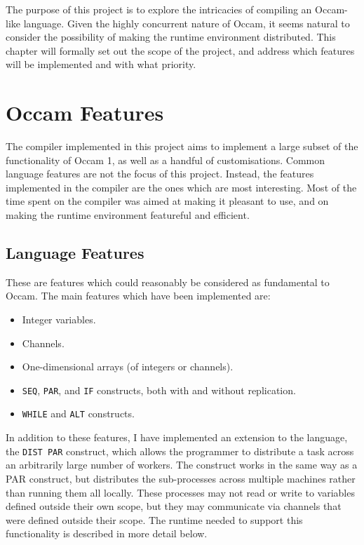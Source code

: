 The purpose of this project is to explore the intricacies of compiling an
Occam-like language. Given the highly concurrent nature of Occam, it seems
natural to consider the possibility of making the runtime environment
distributed. This chapter will formally set out the scope of the project, and
address which features will be implemented and with what priority.

\section{Occam Features}

The compiler implemented in this project aims to implement a large subset of
the functionality of Occam 1, as well as a handful of customisations. Common
language features are not the focus of this project. Instead, the features
implemented in the compiler are the ones which are most interesting. Most of the
time spent on the compiler was aimed at making it pleasant to use, and on making
the runtime environment featureful and efficient.

\subsection{Language Features}

These are features which could reasonably be considered as fundamental to Occam.
The main features which have been implemented are:
\begin{itemize}
  \item Integer variables.
  \item Channels.
  \item One-dimensional arrays (of integers or channels).
  \item \texttt{SEQ}, \texttt{PAR}, and \texttt{IF} constructs, both with and
        without replication.
  \item \texttt{WHILE} and \texttt{ALT} constructs.
\end{itemize}
In addition to these features, I have implemented an extension to the language,
the \texttt{DIST PAR} construct, which allows the programmer to distribute
a task across an arbitrarily large number of workers. The construct works in the
same way as a PAR construct, but distributes the sub-processes across multiple
machines rather than running them all locally. These processes may not read or
write to variables defined outside their own scope, but they may communicate via
channels that were defined outside their scope. The runtime needed to support
this functionality is described in more detail below.


